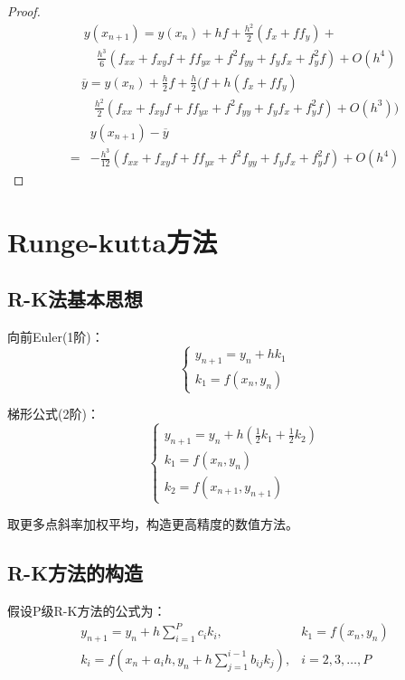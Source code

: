 \documentclass{article}
\begin{document}
\begin{proof}
    \begin{equation*}
        \begin{split}
            &y(x_{n+1})=y(x_n)+hf+\frac{h^2}{2}(f_x+ff_y)+ \\
            &\quad \frac{h^3}{6}(f_{xx} + f_{xy}f + ff_{yx}+f^2f_{yy}+f_yf_x+f^2_yf) + O(h^4)
        \end{split}
    \end{equation*}
    \begin{equation*}
        \begin{split}
            &\overline{y} = y(x_n) + \frac{h}{2}f + \frac{h}{2}(f+ h(f_x+ff_y) \\
            &\quad \frac{h^2}{2}(f_{xx} + f_{xy}f + ff_{yx}+f^2f_{yy}+f_yf_x+f^2_yf) + O(h^3))
        \end{split}
    \end{equation*}
    \begin{align*}
        &y(x_{n+1}) - \overline{y} \\
        =& -\frac{h^3}{12}(f_{xx} + f_{xy}f + ff_{yx}+f^2f_{yy}+f_yf_x+f^2_yf) + O(h^4)
    \end{align*}
\end{proof}

\section{Runge-kutta方法}
\subsection{R-K法基本思想}
向前Euler(1阶)：
$$
\left\{
\begin{array}{lr}
    y_{n+1} = y_n+hk_1\\
    k_1=f(x_n, y_n)
\end{array}\right.
$$

梯形公式(2阶)：
$$
\left\{
\begin{array}{lr}
    y_{n+1} = y_n + h(\frac{1}{2}k_1+\frac{1}{2}k_2)\\
    k_1 = f(x_n, y_n)\\
    k_2 = f(x_{n+1}, y_{n+1})
\end{array}\right.
$$

取更多点斜率加权平均，构造更高精度的数值方法。

\subsection{R-K方法的构造}
假设P级R-K方法的公式为：
\begin{equation}
\begin{array}{lr}
    y_{n+1} = y_n +h\sum^P_{i=1}c_ik_i, &k_1=f(x_n,y_n)\\
    k_i = f(x_n+a_ih, y_n+h\sum^{i-1}_{j=1}b_{ij}k_j), & i=2,3,\dots, P 
\end{array}
\end{equation}
\end{document}
